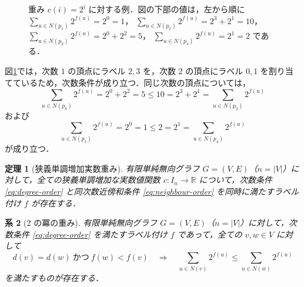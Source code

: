 \documentclass[lualatex,article]{jlreq}
\newtheorem{theorem}{定理}
\newtheorem{corollary}[theorem]{系}
\theoremstyle{jremark}
\begin{document}
\begin{figure}[tbp]
  \centering
  \caption{重み $c(i)=2^i$ に対する例．図の下部の値は，左から順に
  $\sum_{u\in N(p_1)}2^{f(u)}=2^0=1$，
  $\sum_{u\in N(p_2)}2^{f(u)}=2^3+2^1=10$，
  $\sum_{u\in N(p_3)}2^{f(u)}=2^0+2^2=5$，
  $\sum_{u\in N(p_4)}2^{f(u)}=2^1=2$ である．}
  \label{fig:example}
\end{figure}

図\ref{fig:example}では，次数 $1$ の頂点にラベル $2,3$ を，次数 $2$ の頂点にラベル $0,1$ を割り当てているため，次数条件が成り立つ．同じ次数の頂点については，
\[
  \sum_{u\in N(p_3)}2^{f(u)}=2^0+2^2=5
  \leq 10=2^3+2^1=\sum_{u\in N(p_2)}2^{f(u)}
\]
および
\[
  \sum_{u\in N(p_1)}2^{f(u)}=2^0=1
  \leq 2=2^1=\sum_{u\in N(p_4)}2^{f(u)}
\]
が成り立つ．

\begin{theorem}[狭義単調増加実数重み]\label{thm:weights}
  有限単純無向グラフ $G=(V,E)$（$n=|V|$）に対して，全ての狭義単調増加な実数値関数 $c:I_n\to\mathbb R$ について，次数条件 \eqref{eq:degree-order} と同次数近傍和条件 \eqref{eq:neighbour-order} を同時に満たすラベル付け $f$ が存在する．
\end{theorem}

\begin{corollary}[2 の冪の重み]\label{cor:powers}
  有限単純無向グラフ $G=(V,E)$（$n=|V|$）に対して，次数条件 \eqref{eq:degree-order} を満たすラベル付け $f$ であって，全ての $v,w\in V$ に対して
  \[
    d(v)=d(w)\ \text{かつ}\ f(w)<f(v)
    \quad\Longrightarrow\quad
    \sum_{u\in N(v)}2^{f(u)}
    \leq
    \sum_{u\in N(w)}2^{f(u)}
  \]
  を満たすものが存在する．
\end{corollary}
\end{document}
